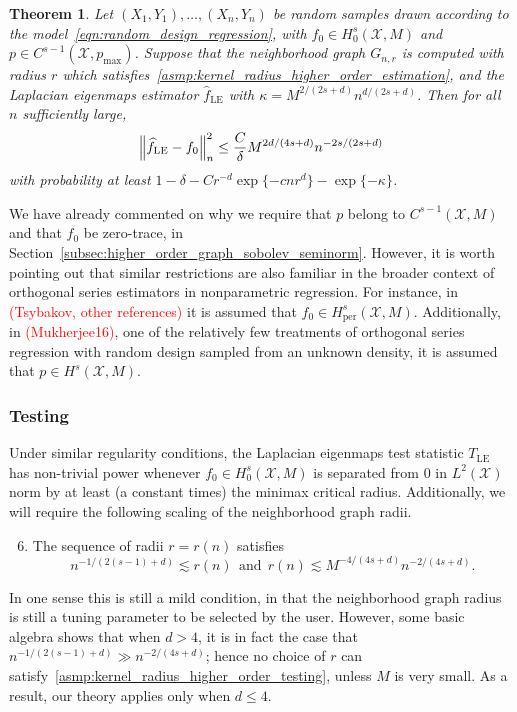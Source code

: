 \documentclass{article}
\newcommand{\1}{\mathbf{1}}
\newcommand{\Xset}{\mathcal{X}}
\newcommand{\Leb}{L}
\newcommand{\wh}[1]{\widehat{#1}}
\newcommand{\LE}{\mathrm{LE}}
\theoremstyle{alden}
\theoremstyle{aldenthm}
\newtheorem{theorem}{Theorem}
\theoremstyle{definition}
\theoremstyle{remark}
\begin{document}
\begin{theorem}
	\label{thm:laplacian_eigenmaps_estimation_higher_order}
	Let $(X_1,Y_1),\ldots,(X_n,Y_n)$ be random samples drawn according to the model~\eqref{eqn:random_design_regression}, with $f_0 \in H_0^s(\Xset,M)$ and $p \in C^{s - 1}(\Xset,p_{\max})$. Suppose that the neighborhood graph $G_{n,r}$ is computed with radius $r$ which satisfies~\ref{asmp:kernel_radius_higher_order_estimation}, and the Laplacian eigenmaps estimator $\wh{f}_{\LE}$ with $\kappa = M^{2/(2s + d)}n^{d/(2s + d)}$. Then for all $n$ sufficiently large,
	\begin{equation*}
	\Bigl\|\wh{f}_{\LE} - f_0\Bigr\|_n^2 \leq \frac{C}{\delta} M^{2d/(4s + d)} n^{-2s/(2s + d)}
	\end{equation*}
	with probability at least $1 - \delta -  Cr^{-d}\exp\{-cnr^d\} - \exp\{-\kappa\}$.
\end{theorem}

We have already commented on why we require that $p$ belong to $C^{s-1}(\Xset,M)$ and that $f_0$ be zero-trace, in Section~\ref{subsec:higher_order_graph_sobolev_seminorm}. However, it is worth pointing out that similar restrictions are also familiar in the broader context of orthogonal series estimators in nonparametric regression. For instance, in \textcolor{red}{(Tsybakov, other references)} it is assumed that $f_0 \in H_{\mathrm{per}}^s(\Xset,M)$. Additionally, in \textcolor{red}{(Mukherjee16)}, one of the relatively few treatments of orthogonal series regression with random design sampled from an unknown density, it is assumed that $p \in H^s(\Xset,M)$. 

\subsubsection{Testing}
\label{subsec:minimax_testing_higher_order}

Under similar regularity conditions, the Laplacian eigenmaps test statistic $T_{\LE}$ has non-trivial power whenever $f_0 \in H_0^s(\Xset,M)$ is separated from $0$ in $\Leb^2(\Xset)$ norm by at least (a constant times) the minimax critical radius. Additionally, we will require the following scaling of the neighborhood graph radii.
\begin{enumerate}[label=(R\arabic*)]
	\setcounter{enumi}{5}
	\item 
	\label{asmp:kernel_radius_higher_order_testing}
	The sequence of radii $r = r(n)$ satisfies
	\begin{equation*}
	n^{-1/(2(s - 1) + d)} \lesssim r(n)~~\textrm{and}~~ r(n) \lesssim M^{-4/(4s + d)}n^{-2/(4s + d)}.
	\end{equation*}
\end{enumerate}
In one sense this is still a mild condition, in that the neighborhood graph radius is still a tuning parameter to be selected by the user. However, some basic algebra shows that when $d > 4$, it is in fact the case that $n^{-1/(2(s - 1) + d)} \gg n^{-2/(4s + d)}$; hence no choice of $r$ can satisfy~\ref{asmp:kernel_radius_higher_order_testing}, unless $M$ is very small. As a result, our theory applies only when $d \leq 4$.
\end{document}
